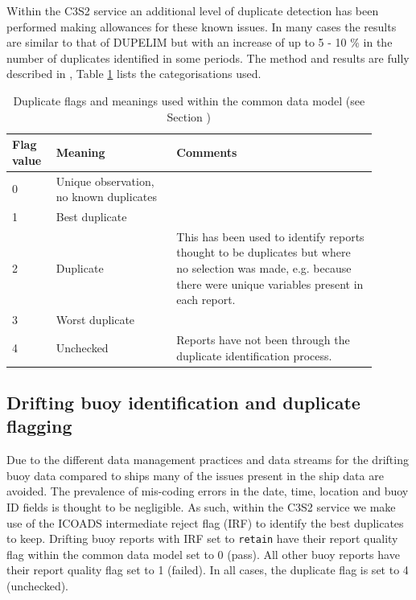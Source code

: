 Within the C3S2 service an additional level of duplicate detection has been performed making allowances for these known issues.
In many cases the results are similar to that of DUPELIM but with an increase of up to 5 - 10 \% in the number of duplicates identified in some periods.
The method and results are fully described in \cite{Kent2019dup}, Table \ref{tab:dup_flags} lists the categorisations used.

\begin{table}[h]
\centering
\caption{Duplicate flags and meanings used within the common data model (see Section )}
\label{tab:dup_flags}
\begin{tabular}{|p{0.1\linewidth}|p{0.3\linewidth}|p{0.5\linewidth}|}
\hline
\bfseries Flag value & \bfseries Meaning & \bfseries Comments \\
\hline
0 & Unique observation, no known duplicates & \\\hline
1 & Best duplicate & \\\hline
2 & Duplicate & This has been used to identify reports thought to be duplicates but where no selection was made, e.g. because there were unique variables present in each report. \\\hline
3 & Worst duplicate & \\\hline
4 & Unchecked & Reports have not been through the duplicate identification process.\\\hline
\end{tabular}
\end{table}

\FloatBarrier
\subsection{Drifting buoy identification and duplicate flagging}\label{buoy-dupelim}
Due to the different data management practices and data streams for the drifting buoy data compared to ships many of the issues present in the ship data are avoided. 
The prevalence of mis-coding errors in the date, time, location and buoy ID fields is thought to be negligible.
As such, within the C3S2 service we make use of the ICOADS intermediate reject flag (IRF) to identify the best duplicates to keep.
Drifting buoy reports with IRF set to \texttt{retain} have their report quality flag within the common data model set to 0 (pass).
All other buoy reports have their report quality flag set to 1 (failed). 
In all cases, the duplicate flag is set to 4 (unchecked).
\FloatBarrier
